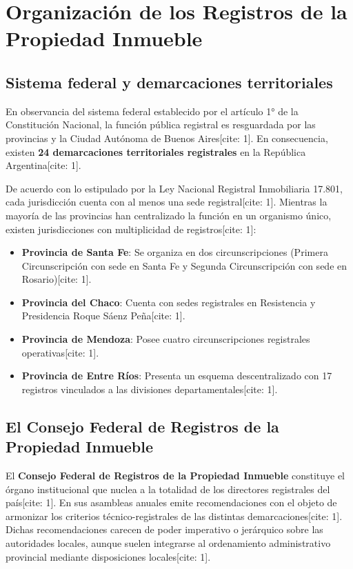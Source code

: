 \documentclass[12pt,oneside]{book}
\begin{document}
\section{Organización de los Registros de la Propiedad Inmueble}

\subsection{Sistema federal y demarcaciones territoriales}

En observancia del sistema federal establecido por el artículo 1° de la Constitución Nacional, la función pública registral es resguardada por las provincias y la Ciudad Autónoma de Buenos Aires[cite: 1]. En consecuencia, existen \textbf{24 demarcaciones territoriales registrales} en la República Argentina[cite: 1].

De acuerdo con lo estipulado por la Ley Nacional Registral Inmobiliaria 17.801, cada jurisdicción cuenta con al menos una sede registral[cite: 1]. Mientras la mayoría de las provincias han centralizado la función en un organismo único, existen jurisdicciones con multiplicidad de registros[cite: 1]:

\begin{itemize}
    \item \textbf{Provincia de Santa Fe}: Se organiza en dos circunscripciones (Primera Circunscripción con sede en Santa Fe y Segunda Circunscripción con sede en Rosario)[cite: 1].
    \item \textbf{Provincia del Chaco}: Cuenta con sedes registrales en Resistencia y Presidencia Roque Sáenz Peña[cite: 1].
    \item \textbf{Provincia de Mendoza}: Posee cuatro circunscripciones registrales operativas[cite: 1].
    \item \textbf{Provincia de Entre Ríos}: Presenta un esquema descentralizado con 17 registros vinculados a las divisiones departamentales[cite: 1].
\end{itemize}

\subsection{El Consejo Federal de Registros de la Propiedad Inmueble}

El \textbf{Consejo Federal de Registros de la Propiedad Inmueble} constituye el órgano institucional que nuclea a la totalidad de los directores registrales del país[cite: 1]. En sus asambleas anuales emite recomendaciones con el objeto de armonizar los criterios técnico-registrales de las distintas demarcaciones[cite: 1]. Dichas recomendaciones carecen de poder imperativo o jerárquico sobre las autoridades locales, aunque suelen integrarse al ordenamiento administrativo provincial mediante disposiciones locales[cite: 1].
\end{document}
